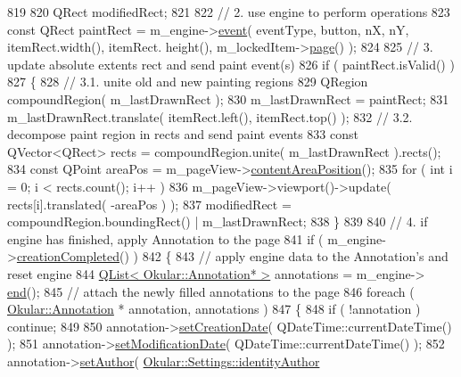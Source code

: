 \begin{DoxyCode}
819 
820     QRect modifiedRect;
821 
822     \textcolor{comment}{// 2. use engine to perform operations}
823     \textcolor{keyword}{const} QRect paintRect = m\_engine->\hyperlink{classAnnotatorEngine_acca989fc60f9a6c20ed2518fafa8774e}{event}( eventType, button, nX, nY, itemRect.width(), itemRect.
      height(), m\_lockedItem->\hyperlink{classPageViewItem_a5c512d95e5563e8d19d1fb3d93dafc31}{page}() );
824 
825     \textcolor{comment}{// 3. update absolute extents rect and send paint event(s)}
826     \textcolor{keywordflow}{if} ( paintRect.isValid() )
827     \{
828         \textcolor{comment}{// 3.1. unite old and new painting regions}
829         QRegion compoundRegion( m\_lastDrawnRect );
830         m\_lastDrawnRect = paintRect;
831         m\_lastDrawnRect.translate( itemRect.left(), itemRect.top() );
832         \textcolor{comment}{// 3.2. decompose paint region in rects and send paint events}
833         \textcolor{keyword}{const} QVector<QRect> rects = compoundRegion.unite( m\_lastDrawnRect ).rects();
834         \textcolor{keyword}{const} QPoint areaPos = m\_pageView->\hyperlink{classPageView_a055aaf87367b9ad0dcfcdc3d2f5ff619}{contentAreaPosition}();
835         \textcolor{keywordflow}{for} ( \textcolor{keywordtype}{int} i = 0; i < rects.count(); i++ )
836             m\_pageView->viewport()->update( rects[i].translated( -areaPos ) );
837         modifiedRect = compoundRegion.boundingRect() | m\_lastDrawnRect;
838     \}
839 
840     \textcolor{comment}{// 4. if engine has finished, apply Annotation to the page}
841     \textcolor{keywordflow}{if} ( m\_engine->\hyperlink{classAnnotatorEngine_a54e1ac7803149f1a94490e5511ad3deb}{creationCompleted}() )
842     \{
843         \textcolor{comment}{// apply engine data to the Annotation's and reset engine}
844         \hyperlink{classQList}{QList< Okular::Annotation* >} annotations = m\_engine->
      \hyperlink{classAnnotatorEngine_a50455740303878b891195132df27a2ab}{end}();
845         \textcolor{comment}{// attach the newly filled annotations to the page}
846         \textcolor{keywordflow}{foreach} ( \hyperlink{classOkular_1_1Annotation}{Okular::Annotation} * annotation, annotations )
847         \{
848             \textcolor{keywordflow}{if} ( !annotation ) \textcolor{keywordflow}{continue};
849 
850             annotation->\hyperlink{classOkular_1_1Annotation_a7b8e97b104dc0b8cd8ff95253d95e167}{setCreationDate}( QDateTime::currentDateTime() );
851             annotation->\hyperlink{classOkular_1_1Annotation_a1ea7e94039a7dc3dce500ae96817b30d}{setModificationDate}( QDateTime::currentDateTime() );
852             annotation->\hyperlink{classOkular_1_1Annotation_ac67827a495bc3ca9fc91c82590c7bf35}{setAuthor}( \hyperlink{classOkular_1_1Settings_ae643409dda70c22852664fa4677896a1}{Okular::Settings::identityAuthor}

\end{DoxyCode}
